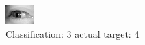 \begin{figure}[h!]
\begin{center}
\includegraphics[width=0.60\columnwidth]{figures/ID3112_class_3_target_4.png}
\end{center}
\caption{ Classification: 3 actual target: 4}
\label{fig:ID3112_class_3_target_4}
\end{figure}
